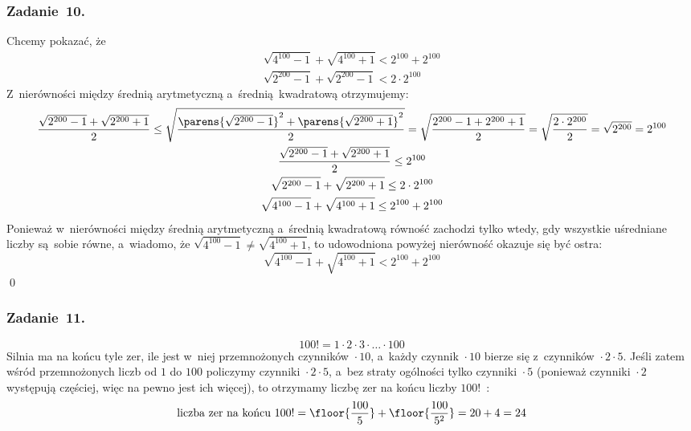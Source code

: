 \subsubsection*{Zadanie~10.}
Chcemy pokazać, że
\begin{gather*}
    \sqrt{4^{100} - 1} + \sqrt{4^{100} + 1} < 2^{100} + 2^{100}\\
    \sqrt{2^{200} - 1} + \sqrt{2^{200} - 1} < 2 \cdot 2^{100}
\end{gather*}
Z~nierówności między średnią arytmetyczną a~średnią kwadratową otrzymujemy:
\begin{gather*}
    \frac{\sqrt{2^{200} - 1} + \sqrt{2^{200} + 1}}{2} \leq \sqrt{\frac{\parens{\sqrt{2^{200} - 1}}^2 + \parens{\sqrt{2^{200} + 1}}^2}{2}}
        = \sqrt{\frac{2^{200} - 1 + 2^{200} + 1}{2}} = \sqrt{\frac{2 \cdot 2^{200}}{2}} = \sqrt{2^{200}} = 2^{100}\\
    \frac{\sqrt{2^{200} - 1} + \sqrt{2^{200} + 1}}{2} \leq 2^{100}\\
    \sqrt{2^{200} - 1} + \sqrt{2^{200} + 1} \leq 2 \cdot 2^{100}\\
    \sqrt{4^{100} - 1} + \sqrt{4^{100} + 1} \leq 2^{100} + 2^{100}
\end{gather*}
Ponieważ w~nierówności między średnią arytmetyczną a~średnią kwadratową równość zachodzi tylko wtedy, gdy wszystkie uśredniane liczby są sobie równe, a~wiadomo, że \(\sqrt{4^{100} - 1} \neq \sqrt{4^{100} + 1}\), to udowodniona powyżej nierówność okazuje się być ostra:
\begin{equation*}
    \sqrt{4^{100} - 1} + \sqrt{4^{100} + 1} < 2^{100} + 2^{100}
\end{equation*}
\qed
\subsubsection*{Zadanie~11.}
\begin{equation*}
    100! = 1 \cdot 2 \cdot 3 \cdot \ldots \cdot 100
\end{equation*}
Silnia ma na końcu tyle zer, ile jest w~niej przemnożonych czynników \({} \cdot 10\), a~każdy czynnik \({} \cdot 10\) bierze się z~czynników \({} \cdot 2 \cdot 5\). Jeśli zatem wśród przemnożonych liczb od \(1\) do \(100\) policzymy czynniki \({} \cdot 2 \cdot 5\), a~bez straty ogólności tylko czynniki \({} \cdot 5\) (ponieważ czynniki \({} \cdot 2\) występują częściej, więc na pewno jest ich więcej), to otrzymamy liczbę zer na końcu liczby \(100!\)\ :
\begin{equation*}
    \text{liczba zer na końcu } 100! = \floor{\frac{100}{5}} + \floor{\frac{100}{5^2}} = 20 + 4 = 24
\end{equation*}

